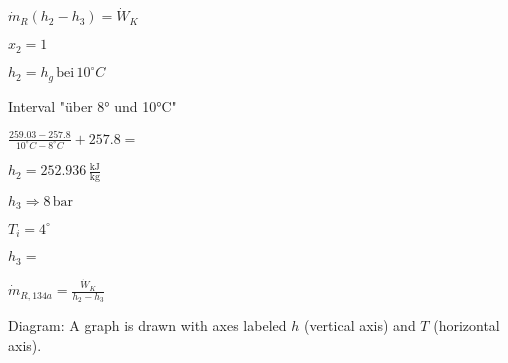 \( \dot{m}_R (h_2 - h_3) = \dot{W}_K \)  

\( x_2 = 1 \)  

\( h_2 = h_g \, \text{bei} \, 10^\circ C \)  

Interval "über 8° und 10°C"  

\( \frac{259.03 - 257.8}{10^\circ C - 8^\circ C} + 257.8 = \)  

\( h_2 = 252.936 \, \frac{\text{kJ}}{\text{kg}} \)  

\( h_3 \Rightarrow 8 \, \text{bar} \)  

\( T_i = 4^\circ \)  

\( h_3 = \)  

\( \dot{m}_{R,134a} = \frac{\dot{W}_K}{h_2 - h_3} \)  

Diagram: A graph is drawn with axes labeled \( h \) (vertical axis) and \( T \) (horizontal axis).